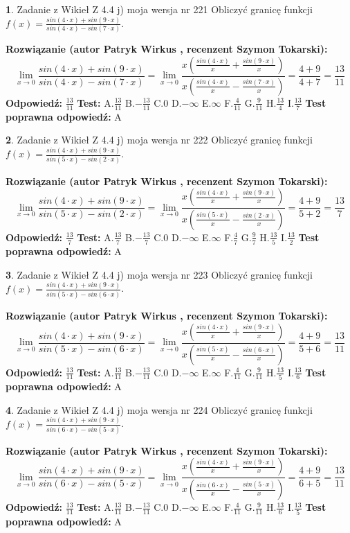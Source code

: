 \documentclass[12pt, a4paper]{article}
\theoremstyle{definition} %
\newtheorem{zad}{}
\newcommand{\zadStart}[1]{\begin{zad}#1\newline}
\newcommand{\zadStop}{\end{zad}}
\newcommand{\rozwStart}[2]{\noindent \textbf{Rozwiązanie (autor #1 , recenzent #2): }\newline}
\newcommand{\rozwStop}{\newline}
\newcommand{\odpStart}{\noindent \textbf{Odpowiedź:}\newline}
\newcommand{\odpStop}{\newline}
\newcommand{\testStart}{\noindent \textbf{Test:}\newline}
\newcommand{\testStop}{\newline}
\newcommand{\kluczStart}{\noindent \textbf{Test poprawna odpowiedź:}\newline}
\newcommand{\kluczStop}{\newline}
\begin{document}
\zadStart{Zadanie z Wikieł Z 4.4 j) moja wersja nr 221}
Obliczyć granicę funkcji $f(x)=\frac{sin(4\cdot x) +sin(9\cdot x)}{sin(4\cdot x) -sin(7\cdot x)}$.
\zadStop
\rozwStart{Patryk Wirkus}{Szymon Tokarski}
$$\lim\limits_{x\to 0}\frac{sin(4\cdot x) +sin(9\cdot x)}{sin(4\cdot x) -sin(7\cdot x)}=\lim\limits_{x\to 0}\frac{x(\frac{sin(4\cdot x)}{x}+\frac{sin(9\cdot x)}{x})}{x(\frac{sin(4\cdot x)}{x}-\frac{sin(7\cdot x)}{x})}=\frac{4+9}{4+7} = \frac{13}{11}$$
\rozwStop
\odpStart
$\frac{13}{11}$
\odpStop
\testStart
A.$\frac{13}{11}$
B.$-\frac{13}{11}$
C.$0$
D.$-\infty$
E.$\infty$
F.$\frac{4}{11}$
G.$\frac{9}{11}$
H.$\frac{13}{4}$
I.$\frac{13}{7}$
\testStop
\kluczStart
A
\kluczStop



\zadStart{Zadanie z Wikieł Z 4.4 j) moja wersja nr 222}
Obliczyć granicę funkcji $f(x)=\frac{sin(4\cdot x) +sin(9\cdot x)}{sin(5\cdot x) -sin(2\cdot x)}$.
\zadStop
\rozwStart{Patryk Wirkus}{Szymon Tokarski}
$$\lim\limits_{x\to 0}\frac{sin(4\cdot x) +sin(9\cdot x)}{sin(5\cdot x) -sin(2\cdot x)}=\lim\limits_{x\to 0}\frac{x(\frac{sin(4\cdot x)}{x}+\frac{sin(9\cdot x)}{x})}{x(\frac{sin(5\cdot x)}{x}-\frac{sin(2\cdot x)}{x})}=\frac{4+9}{5+2} = \frac{13}{7}$$
\rozwStop
\odpStart
$\frac{13}{7}$
\odpStop
\testStart
A.$\frac{13}{7}$
B.$-\frac{13}{7}$
C.$0$
D.$-\infty$
E.$\infty$
F.$\frac{4}{7}$
G.$\frac{9}{7}$
H.$\frac{13}{5}$
I.$\frac{13}{2}$
\testStop
\kluczStart
A
\kluczStop



\zadStart{Zadanie z Wikieł Z 4.4 j) moja wersja nr 223}
Obliczyć granicę funkcji $f(x)=\frac{sin(4\cdot x) +sin(9\cdot x)}{sin(5\cdot x) -sin(6\cdot x)}$.
\zadStop
\rozwStart{Patryk Wirkus}{Szymon Tokarski}
$$\lim\limits_{x\to 0}\frac{sin(4\cdot x) +sin(9\cdot x)}{sin(5\cdot x) -sin(6\cdot x)}=\lim\limits_{x\to 0}\frac{x(\frac{sin(4\cdot x)}{x}+\frac{sin(9\cdot x)}{x})}{x(\frac{sin(5\cdot x)}{x}-\frac{sin(6\cdot x)}{x})}=\frac{4+9}{5+6} = \frac{13}{11}$$
\rozwStop
\odpStart
$\frac{13}{11}$
\odpStop
\testStart
A.$\frac{13}{11}$
B.$-\frac{13}{11}$
C.$0$
D.$-\infty$
E.$\infty$
F.$\frac{4}{11}$
G.$\frac{9}{11}$
H.$\frac{13}{5}$
I.$\frac{13}{6}$
\testStop
\kluczStart
A
\kluczStop



\zadStart{Zadanie z Wikieł Z 4.4 j) moja wersja nr 224}
Obliczyć granicę funkcji $f(x)=\frac{sin(4\cdot x) +sin(9\cdot x)}{sin(6\cdot x) -sin(5\cdot x)}$.
\zadStop
\rozwStart{Patryk Wirkus}{Szymon Tokarski}
$$\lim\limits_{x\to 0}\frac{sin(4\cdot x) +sin(9\cdot x)}{sin(6\cdot x) -sin(5\cdot x)}=\lim\limits_{x\to 0}\frac{x(\frac{sin(4\cdot x)}{x}+\frac{sin(9\cdot x)}{x})}{x(\frac{sin(6\cdot x)}{x}-\frac{sin(5\cdot x)}{x})}=\frac{4+9}{6+5} = \frac{13}{11}$$
\rozwStop
\odpStart
$\frac{13}{11}$
\odpStop
\testStart
A.$\frac{13}{11}$
B.$-\frac{13}{11}$
C.$0$
D.$-\infty$
E.$\infty$
F.$\frac{4}{11}$
G.$\frac{9}{11}$
H.$\frac{13}{6}$
I.$\frac{13}{5}$
\testStop
\kluczStart
A
\kluczStop
\end{document}
